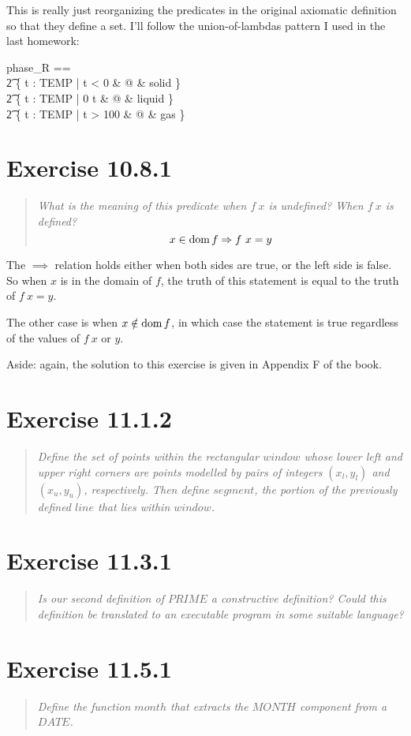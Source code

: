 \documentclass[10pt]{article}
\begin{document}
This is really just reorganizing the predicates in the original axiomatic definition so that they
define a set.  I'll follow the union-of-lambdas pattern I used in the last homework:

\begin{syntax}
  phase_R ==                                                         \\
  \t2 \{ \lambda t : TEMP | t < 0             & @ & solid \} \union  \\
  \t2 \{ \lambda t : TEMP | 0 \leq t  & @ & liquid \} \union \\
  \t2 \{ \lambda t : TEMP | t > 100           & @ & gas \}
\end{syntax}



\section{Exercise 10.8.1}
\begin{quote}
  {\it What is the meaning of this predicate when $f\ x$ is undefined?  When $f\ x$ is defined? }
  \[ x \in \mathop{\mathrm{dom}} f \Rightarrow f\ x = y \]
\end{quote}

The $\implies$ relation holds either when both sides are true, or the left side is false.  So when
$x$ is in the domain of $f$, the truth of this statement is equal to the truth of $f\ x = y$.

The other case is when $x \notin \mathop{\mathrm{dom}} f$, in which case the statement is true regardless of the
values of $f\ x$ or $y$.

Aside: again, the solution to this exercise is given in Appendix F of the book.

\section{Exercise 11.1.2}
\begin{quote}
  {\it Define the set of points within the rectangular $window$ whose lower left and upper right
    corners are points modelled by pairs of integers $(x_l, y_l)$ and $(x_u, y_u)$, respectively.
    Then define $segment$, the portion of the previously defined $line$ that lies within $window$.  }
\end{quote}



\section{Exercise 11.3.1}
\begin{quote}
  {\it Is our second definition of $PRIME$ a constructive definition?  Could this definition be
    translated to an executable program in some suitable language?  }
\end{quote}



\section{Exercise 11.5.1}
\begin{quote}
  {\it Define the function $month$ that extracts the $MONTH$ component from a $DATE$.  }
\end{quote}

\end{document}
